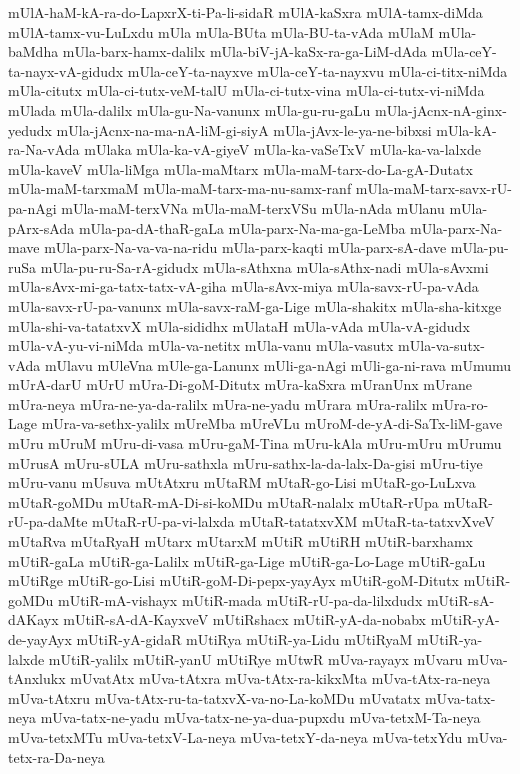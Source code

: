 {mUlA-haM-kA-ra-do-LapxrX-ti-Pa-li-sidaR
mUlA-kaSxra
mUlA-tamx-diMda
mUlA-tamx-vu-LuLxdu
mUla
mUla-BUta
mUla-BU-ta-vAda
mUlaM
mUla-baMdha
mUla-barx-hamx-dalilx
mUla-biV-jA-kaSx-ra-ga-LiM-dAda
mUla-ceY-ta-nayx-vA-gidudx
mUla-ceY-ta-nayxve
mUla-ceY-ta-nayxvu
mUla-ci-titx-niMda
mUla-citutx
mUla-ci-tutx-veM-talU
mUla-ci-tutx-vina
mUla-ci-tutx-vi-niMda
mUlada
mUla-dalilx
mUla-gu-Na-vanunx
mUla-gu-ru-gaLu
mUla-jAcnx-nA-ginx-yedudx
mUla-jAcnx-na-ma-nA-liM-gi-siyA
mUla-jAvx-le-ya-ne-bibxsi
mUla-kA-ra-Na-vAda
mUlaka
mUla-ka-vA-giyeV
mUla-ka-vaSeTxV
mUla-ka-va-lalxde
mUla-kaveV
mUla-liMga
mUla-maMtarx
mUla-maM-tarx-do-La-gA-Dutatx
mUla-maM-tarxmaM
mUla-maM-tarx-ma-nu-samx-ranf
mUla-maM-tarx-savx-rU-pa-nAgi
mUla-maM-terxVNa
mUla-maM-terxVSu
mUla-nAda
mUlanu
mUla-pArx-sAda
mUla-pa-dA-thaR-gaLa
mUla-parx-Na-ma-ga-LeMba
mUla-parx-Na-mave
mUla-parx-Na-va-va-na-ridu
mUla-parx-kaqti
mUla-parx-sA-dave
mUla-pu-ruSa
mUla-pu-ru-Sa-rA-gidudx
mUla-sAthxna
mUla-sAthx-nadi
mUla-sAvxmi
mUla-sAvx-mi-ga-tatx-tatx-vA-giha
mUla-sAvx-miya
mUla-savx-rU-pa-vAda
mUla-savx-rU-pa-vanunx
mUla-savx-raM-ga-Lige
mUla-shakitx
mUla-sha-kitxge
mUla-shi-va-tatatxvX
mUla-sididhx
mUlataH
mUla-vAda
mUla-vA-gidudx
mUla-vA-yu-vi-niMda
mUla-va-netitx
mUla-vanu
mUla-vasutx
mUla-va-sutx-vAda
mUlavu
mUleVna
mUle-ga-Lanunx
mUli-ga-nAgi
mUli-ga-ni-rava
mUmumu
mUrA-darU
mUrU
mUra-Di-goM-Ditutx
mUra-kaSxra
mUranUnx
mUrane
mUra-neya
mUra-ne-ya-da-ralilx
mUra-ne-yadu
mUrara
mUra-ralilx
mUra-ro-Lage
mUra-va-sethx-yalilx
mUreMba
mUreVLu
mUroM-de-yA-di-SaTx-liM-gave
mUru
mUruM
mUru-di-vasa
mUru-gaM-Tina
mUru-kAla
mUru-mUru
mUrumu
mUrusA
mUru-sULA
mUru-sathxla
mUru-sathx-la-da-lalx-Da-gisi
mUru-tiye
mUru-vanu
mUsuva
mUtAtxru
mUtaRM
mUtaR-go-Lisi
mUtaR-go-LuLxva
mUtaR-goMDu
mUtaR-mA-Di-si-koMDu
mUtaR-nalalx
mUtaR-rUpa
mUtaR-rU-pa-daMte
mUtaR-rU-pa-vi-lalxda
mUtaR-tatatxvXM
mUtaR-ta-tatxvXveV
mUtaRva
mUtaRyaH
mUtarx
mUtarxM
mUtiR
mUtiRH
mUtiR-barxhamx
mUtiR-gaLa
mUtiR-ga-Lalilx
mUtiR-ga-Lige
mUtiR-ga-Lo-Lage
mUtiR-gaLu
mUtiRge
mUtiR-go-Lisi
mUtiR-goM-Di-pepx-yayAyx
mUtiR-goM-Ditutx
mUtiR-goMDu
mUtiR-mA-vishayx
mUtiR-mada
mUtiR-rU-pa-da-lilxdudx
mUtiR-sA-dAKayx
mUtiR-sA-dA-KayxveV
mUtiRshacx
mUtiR-yA-da-nobabx
mUtiR-yA-de-yayAyx
mUtiR-yA-gidaR
mUtiRya
mUtiR-ya-Lidu
mUtiRyaM
mUtiR-ya-lalxde
mUtiR-yalilx
mUtiR-yanU
mUtiRye
mUtwR
mUva-rayayx
mUvaru
mUva-tAnxlukx
mUvatAtx
mUva-tAtxra
mUva-tAtx-ra-kikxMta
mUva-tAtx-ra-neya
mUva-tAtxru
mUva-tAtx-ru-ta-tatxvX-va-no-La-koMDu
mUvatatx
mUva-tatx-neya
mUva-tatx-ne-yadu
mUva-tatx-ne-ya-dua-pupxdu
mUva-tetxM-Ta-neya
mUva-tetxMTu
mUva-tetxV-La-neya
mUva-tetxY-da-neya
mUva-tetxYdu
mUva-tetx-ra-Da-neya
}

